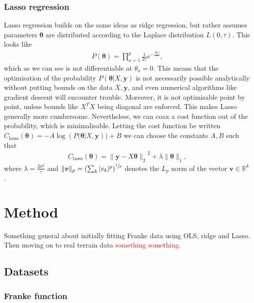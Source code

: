 \documentclass[twocolumn,english,notitlepage]{article}
\newcommand{\comment}[1]{\textcolor{red}{#1}}
\renewcommand{\vec}[1]{\boldsymbol{#1}}
\newcommand{\pclosed}[1]{\left(#1\right)}
\renewcommand{\norm}[2][]{\ensuremath{\|#2\|_{#1}}}
\renewcommand{\exp}[1]{e^{#1}}
\newcommand{\msub}[2]{\ensuremath{{#1}_\text{#2}}}
\begin{document}
        \subsubsection{Lasso regression}
            Lasso regression builds on the same ideas as ridge regression, but rather assumes parameters $\vec{\theta}$ are distributed according to the Laplace distribution $L(0, \tau)$. This looks like
            \begin{align}
                P(\vec{\theta}) = \prod_{a=1}^{p} \frac{1}{2\tau} \exp{-\frac{|\theta_a|}{\tau}},
            \end{align}
            which as we can see is not differentiable at $\theta_a = 0$. This means that the optimisation of the probability $P(\vec{\theta}|X, \vec{y})$ is not necessarily possible analytically without putting bounds on the data $X, \vec{y}$, and even numerical algorithms like gradient descent will encounter trouble. Moreover, it is not optimisable point by point, unless bounds like $X^TX$ being diagonal are enforced. This makes Lasso generally more cumbersome. Nevertheless, we can coax a cost function out of the probability, which is minimalisable. Letting the cost function be written $\msub{C}{lasso}(\vec{\theta}) = -A\log\pclosed{P(\vec{\theta}|X,\vec{y}}) + B$  we can choose the constants $A, B$ such that
            \begin{align}
                \boxed{
                    \msub{C}{lasso}(\vec{\vec{\theta}}) = \norm[2]{ \vec{y} - X\vec{\theta} }^2 + \lambda \norm[1]{\vec{\theta}},
                }
                \label{theo:eq:Lasso_costfunction}
            \end{align}
            where $\lambda = \frac{2\sigma^2}{\tau}$ and $\norm[p]{\vec{v}} = \pclosed{\sum_k |v_k|^p}^{\sfrac{1}{p}}$ denotes the $L_p$ norm of the vector $\vec{v} \in \mathbb{R}^k$.


\section{Method}
    Something general about initially fitting Franke data using OLS, ridge and Lasso. Then moving on to real terrain data \comment{something something}.
    
    \subsection{Datasets}
        \subsubsection*{Franke function}
\end{document}
